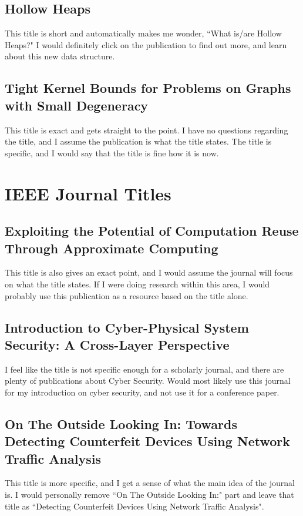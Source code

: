 \documentclass[twocolumn]{article}
\begin{document}
\subsection{Hollow Heaps}
This title is short and automatically makes me wonder, ``What is/are Hollow Heaps?" I would definitely click on the publication to find out more, and learn about this new data structure.
\subsection{Tight Kernel Bounds for Problems on Graphs with Small Degeneracy }
This title is exact and gets straight to the point. I have no questions regarding the title, and I assume the publication is what the title states. The title is specific, and I would say that the title is fine how it is now.

\section{IEEE Journal Titles}
\subsection{Exploiting the Potential of Computation Reuse Through Approximate Computing}
This title is also gives an exact point, and I would assume the journal will focus on what the title states. If I were doing research within this area, I would probably use this publication as a resource based on the title alone.
\subsection{Introduction to Cyber-Physical System Security: A Cross-Layer Perspective}
I feel like the title is not specific enough for a scholarly journal, and there are plenty of publications about Cyber Security. Would most likely use this journal for my introduction on cyber security, and not use it for a conference paper.
\subsection{On The Outside Looking In: Towards Detecting Counterfeit Devices Using Network Traffic Analysis}
This title is more specific, and I get a sense of what the main idea of the journal is. I would personally remove ``On The Outside Looking In:" part and leave that title as ``Detecting Counterfeit Devices Using Network Traffic Analysis".
\end{document}

